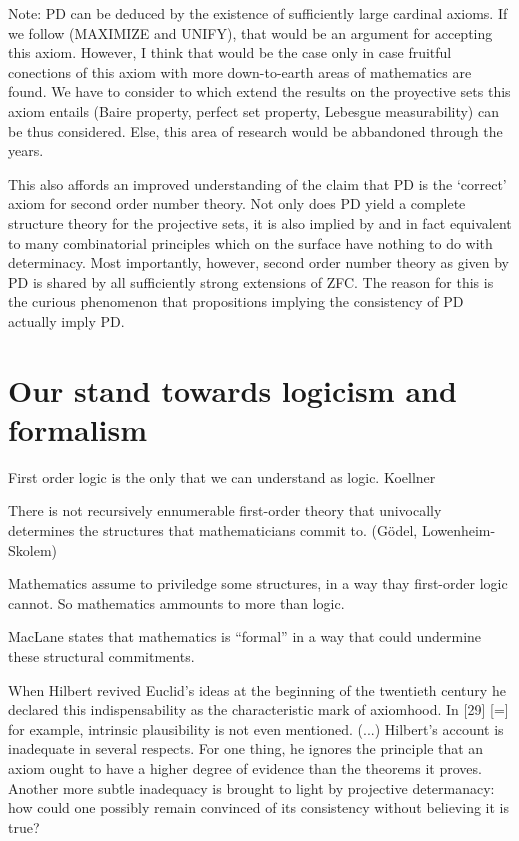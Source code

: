 \documentclass[11pt,a4paper]{book}
\theoremstyle{plain}
\begin{document}
Note: PD can be deduced by the existence of sufficiently large cardinal axioms. If we follow \textcite{Maddy1997} (MAXIMIZE and UNIFY), that would be an argument for accepting this axiom. However, I think that would be the case only in case fruitful conections of this axiom with more down-to-earth areas of mathematics are found. We have to consider to which extend the results on the proyective sets this axiom entails (Baire property, perfect set property, Lebesgue measurability) can be thus considered. Else, this area of research would be abbandoned through the years.

This also affords an improved understanding of the claim that PD is the ‘correct’ axiom for second order number theory. Not only does PD yield a complete structure theory for the projective sets, it is also implied by and in fact equivalent to many combinatorial principles which on the surface have nothing to do with determinacy. Most importantly, however, second order number theory as given by PD is shared by all sufficiently strong extensions of ZFC. The reason for this is the curious phenomenon that propositions implying the consistency of PD actually imply PD. \textcite[p. 100]{hauser2004}



\section{Our stand towards logicism and formalism}

First order logic is the only that we can understand as logic. Koellner

There is not recursively ennumerable first-order theory that univocally determines the structures that mathematicians commit to.  (Gödel, Lowenheim-Skolem)

Mathematics assume to priviledge some structures, in a way thay first-order logic cannot. So mathematics ammounts to more than logic.

MacLane states that mathematics is ``formal'' in a way that could undermine these structural commitments.

When Hilbert revived Euclid’s ideas at the beginning of the twentieth century he declared this indispensability as the characteristic mark of axiomhood. In [29] [=\textcite{Hilbert1918}] for example, intrinsic plausibility is not even mentioned. (...) Hilbert’s account is inadequate in several respects. For one thing, he ignores the principle that an axiom ought to have a higher degree of evidence than the theorems it proves. Another more subtle inadequacy is brought to light by projective determanacy: how could one possibly remain convinced of its consistency without believing it is true? \textcite[p. 102]{hauser2004}
\end{document}
